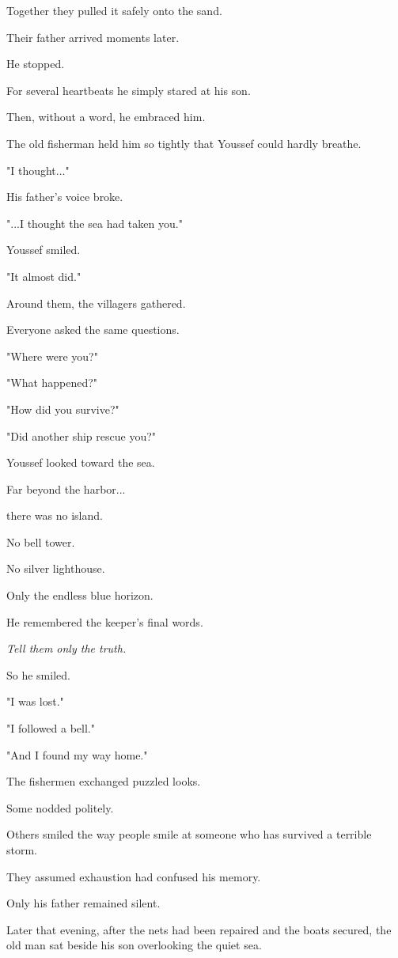 \documentclass[12pt,openany]{book}
\begin{document}
Together they pulled it safely onto the sand.

Their father arrived moments later.

He stopped.

For several heartbeats he simply stared at his son.

Then, without a word, he embraced him.

The old fisherman held him so tightly that Youssef could hardly breathe.

"I thought..."

His father's voice broke.

"...I thought the sea had taken you."

Youssef smiled.

"It almost did."

Around them, the villagers gathered.

Everyone asked the same questions.

"Where were you?"

"What happened?"

"How did you survive?"

"Did another ship rescue you?"

Youssef looked toward the sea.

Far beyond the harbor...

there was no island.

No bell tower.

No silver lighthouse.

Only the endless blue horizon.

He remembered the keeper's final words.

\emph{Tell them only the truth.}

So he smiled.

"I was lost."

"I followed a bell."

"And I found my way home."

The fishermen exchanged puzzled looks.

Some nodded politely.

Others smiled the way people smile at someone who has survived a terrible storm.

They assumed exhaustion had confused his memory.

Only his father remained silent.

Later that evening, after the nets had been repaired and the boats secured, the old man sat beside his son overlooking the quiet sea.
\end{document}
